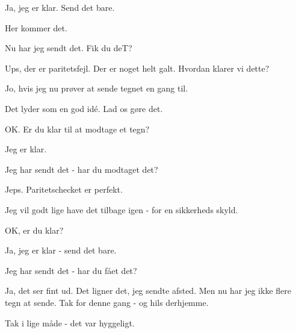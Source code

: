 \documentclass[a4paper,11pt]{article}
\begin{document}
\begin{sketch}
   Ja, jeg er klar.  Send det bare.

   Her kommer det.

   Nu har jeg sendt det.  Fik du deT?

   Ups, der er paritetsfejl.  Der er noget helt galt.  Hvordan
  klarer vi dette?

   Jo, hvis jeg nu prøver at sende tegnet en gang til.

   Det lyder som en god idé.  Lad os gøre det.

   OK.  Er du klar til at modtage et tegn?

   Jeg er klar.

   Jeg har sendt det - har du modtaget det?

   Jeps.  Paritetschecket er perfekt.

   Jeg vil godt lige have det tilbage igen - for en sikkerheds skyld.

   OK, er du klar?

   Ja, jeg er klar - send det bare.

   Jeg har sendt det - har du fået det?

   Ja, det ser fint ud.  Det ligner det, jeg sendte afsted.
  Men nu har jeg ikke flere tegn at sende.  Tak for denne gang - og hils
  derhjemme.

   Tak i lige måde - det var hyggeligt.

\end{sketch}
\end{document}
